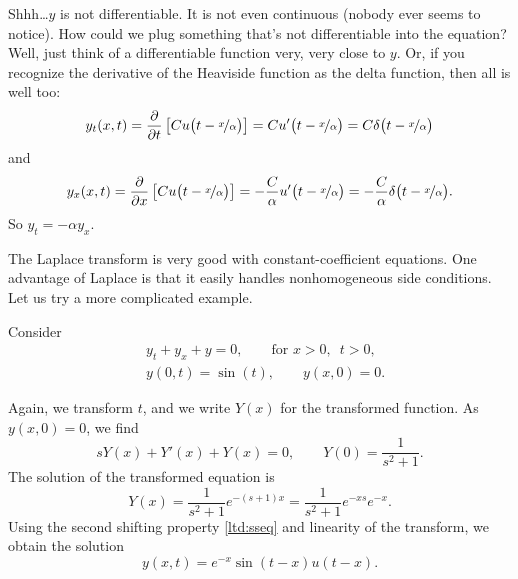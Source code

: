 \begin{example}
\begin{myfig}
\capstart
{}
\caption{Wavefront of toxic substance is a line of slope
$\nicefrac{1}{\alpha}$.\label{lt:half-infinite-goo-river-wavefront}}
\end{myfig}


Shhh\ldots $y$ is not differentiable.
It is not even continuous
(nobody ever seems to notice).  How could we plug something that's not
differentiable into the equation?
Well, just think of a differentiable function very, very close to $y$.
Or, if you recognize the derivative of the Heaviside function as the delta
function, then all is well too:
\begin{equation*}
y_t (x,t) = \frac{\partial}{\partial t} \left[
C  u\bigl(t-\nicefrac{x}{\alpha}\bigr)
\right]
=
C  u'\bigl(t-\nicefrac{x}{\alpha}\bigr)
=
C \delta\bigl(t-\nicefrac{x}{\alpha}\bigr)
\end{equation*}
and
\begin{equation*}
y_x (x,t) = \frac{\partial}{\partial x} \left[
C  u\bigl(t-\nicefrac{x}{\alpha}\bigr)
\right]
=
- \frac{C}{\alpha}  u'\bigl(t-\nicefrac{x}{\alpha}\bigr)
=
- \frac{C}{\alpha} \delta\bigl(t-\nicefrac{x}{\alpha}\bigr) .
\end{equation*}
So $y_t = - \alpha y_x$.
\end{example}

The Laplace transform is very good with constant-coefficient equations.  One
advantage of Laplace is that it easily handles
nonhomogeneous side conditions.
Let us try a more complicated example.

\begin{example}
Consider
\begin{align*}
& y_t + y_x + y = 0, \qquad \text{for } x > 0, \enspace t > 0,
\\
& y(0,t) = \sin(t), \qquad y(x,0) = 0 .
\end{align*}

Again, we transform $t$, and we write $Y(x)$ for the
transformed function.  As $y(x,0) = 0$, we find
\begin{equation*}
sY(x) + Y'(x) + Y(x) = 0, \qquad 
Y(0) = \frac{1}{s^2+1} .
\end{equation*}
The solution of the transformed equation is
\begin{equation*}
Y(x) =
\frac{1}{s^2+1} e^{-(s+1) x}
=
\frac{1}{s^2+1} e^{-xs}
e^{-x}
.
\end{equation*}
Using the second shifting property \eqref{ltd:sseq}
and linearity of the transform,
we obtain the solution
\begin{equation*}
y(x,t) 
=
e^{-x}
\sin(t-x)
u(t-x) .
\end{equation*}
\end{example}

